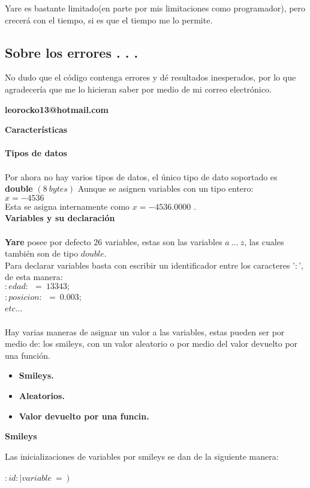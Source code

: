 \documentclass{book}
\begin{document}
Yare es bastante limitado(en parte por mis limitaciones como programador), pero crecer\'a con el tiempo, si es que el tiempo me lo permite.


\subsection{Sobre los errores . . .}

No dudo que el c\'odigo contenga errores y d\'e resultados inesperados, por lo que agradecer\'ia que me lo hicieran saber por medio de mi
correo electr\'onico.

{\bf leorocko13@hotmail.com}

\newpage
{\bf \LARGE Caracter\'isticas}
\\\\{\bf \large Tipos de datos}\\\\

Por ahora no hay varios tipos de datos, el \'unico tipo de dato soportado es {\bf double} $(8\ bytes )$ \linebreak
\linebreak Aunque se asignen variables con un tipo entero:\\
$x = -4536$\\Esta se asigna internamente como
$x = -4536{.}0000$ .\\

{\bf \large Variables y su declaraci\'on}\\\\

{\bf Yare} posee por defecto $26$ variables, estas son las variables $a\ ...\ z$, las cuales tambi\'en son de tipo $double$.\\

Para declarar variables basta con escribir un identificador entre los caracteres '$:$', de esta manera:\\
$:edad:\ \ =\ 13343;$\\
$:posicion:\ \ =\ 0{.}003$;\\
$etc$...\\\\
Hay varias maneras de asignar un valor a las variables, estas pueden ser por medio de: los smileys, con un valor aleatorio o por medio del valor devuelto
por una funci\'on.

\begin{itemize}
\item {\bf Smileys.}
\item {\bf Aleatorios.}
\item {\bf Valor devuelto por una funcin.}
\end{itemize}

\textbf{Smileys}


Las inicializaciones de variables por smileys se dan de la siguiente manera:\\\\
$:id:|variable\ = \:)$
\end{document}
